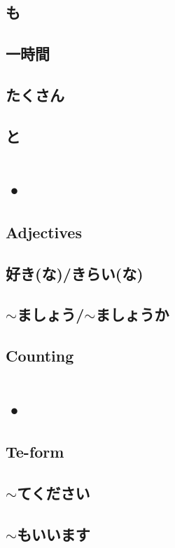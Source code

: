 \documentclass{article}
\begin{document}
   \subsection{も}
   \subsection{一時間}
   \subsection{たくさん}
   \subsection{と}
   
   \newpage
   
   \section{•}
   \subsection{Adjectives}
   \subsection{好き(な)/きらい(な)}
   \subsection{$\sim$ましょう/$\sim$ましょうか}
   \subsection{Counting}
   
   \newpage
   
   \section{•}
   \subsection{Te-form}
   \subsection{$\sim$てください}
   \subsection{$\sim$もいいます}
\end{document}
